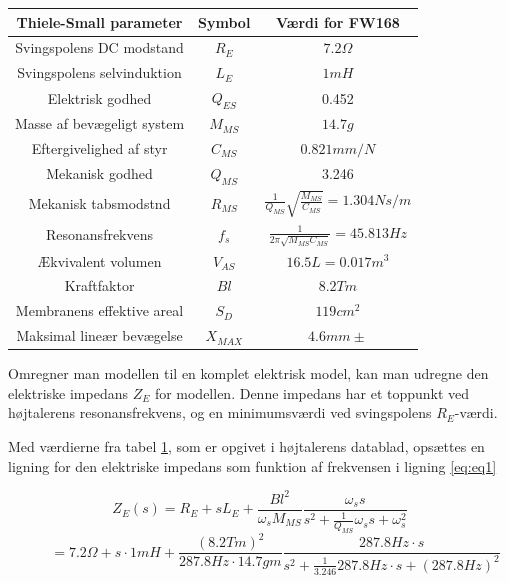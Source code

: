 \begin{table}
	\centering
	\begin{tabular}[C]{|c|c|c|}
		
		
		\hline	
		\textbf{Thiele-Small parameter} & \textbf{Symbol} & \textbf{Værdi for FW168} \\\hline
		Svingspolens DC modstand & $R_E$ & $7.2\Omega$ \\\hline
		Svingspolens selvinduktion & $L_E$ & $1mH$  \\\hline
		Elektrisk godhed & $Q_{ES}$ & 0.452 \\\hline
		Masse af bevægeligt system & $M_{MS}$ & $14.7g$  \\\hline
		Eftergivelighed af styr & $C_{MS}$ & $0.821mm/N$  \\\hline
		Mekanisk godhed & $Q_{MS}$ & 3.246  \\\hline
		Mekanisk tabsmodstnd & $R_{MS}$ & \( \frac{1}{Q_{MS}}\sqrt{\frac{M_{MS}}{C_{MS}}}=1.304Ns/m \)  \\\hline
		Resonansfrekvens & $f_s$ & \( \frac{1}{2\pi\sqrt{M_{MS} C_{MS}}}=45.813Hz \) \\\hline
		
		
		Ækvivalent volumen & $ V_{AS} $ & $16.5L=0.017m^3$ \\\hline
		Kraftfaktor & $Bl$ & $8.2Tm$ \\\hline
		Membranens effektive areal & $S_D$ & $119cm^2$ \\\hline
		Maksimal lineær bevægelse & $X_{MAX}$ & $4.6mm\pm$ \\\hline
		
	\end{tabular}
	\label{tab:TS}
\end{table}

Omregner man modellen til en komplet elektrisk model, kan man udregne den elektriske impedans $Z_E$ for modellen. Denne impedans har et toppunkt ved højtalerens resonansfrekvens, og en minimumsværdi ved svingspolens $R_E$-værdi. 

Med værdierne fra tabel \ref{tab:TS}, som er opgivet i højtalerens datablad\cite{FW168}, opsættes en ligning for den elektriske impedans som funktion af frekvensen i ligning \ref{eq:eq1}

\begin{equation}\label{eq:eq1}
	Z_E(s)=R_E+sL_E+\frac{Bl^2}{\omega_s M_{MS}} \frac{ \omega_s s}{ s^2 + \frac{1}{Q_{MS}} \omega_s s + \omega_s^2} \end{equation} \begin{equation} \ \qquad  = 
	7.2\Omega + s \cdot 1mH + \frac{(8.2 Tm)^2}{287.8Hz \cdot 14.7gm} \frac{ 287.8Hz \cdot s}{ s^2 + \frac{1}{3.246} 287.8Hz \cdot s + (287.8Hz)^2}  \end{equation}

